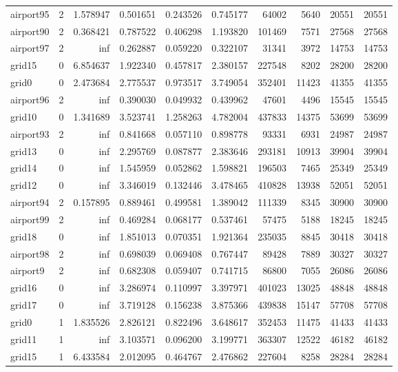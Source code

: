 \documentclass[../../../thesis.tex]{subfiles}
\begin{document}
\begin{longtable}{|l|r|r|r|r|r|r|r|r|r|}
airport95 & 2 & 1.578947 & 0.501651 & 0.243526 & 0.745177 & 64002 & 5640 & 20551 & 20551 \\
airport90 & 2 & 0.368421 & 0.787522 & 0.406298 & 1.193820 & 101469 & 7571 & 27568 & 27568 \\
airport97 & 2 & inf & 0.262887 & 0.059220 & 0.322107 & 31341 & 3972 & 14753 & 14753 \\
grid15 & 0 & 6.854637 & 1.922340 & 0.457817 & 2.380157 & 227548 & 8202 & 28200 & 28200 \\
grid0 & 0 & 2.473684 & 2.775537 & 0.973517 & 3.749054 & 352401 & 11423 & 41355 & 41355 \\
airport96 & 2 & inf & 0.390030 & 0.049932 & 0.439962 & 47601 & 4496 & 15545 & 15545 \\
grid10 & 0 & 1.341689 & 3.523741 & 1.258263 & 4.782004 & 437833 & 14375 & 53699 & 53699 \\
airport93 & 2 & inf & 0.841668 & 0.057110 & 0.898778 & 93331 & 6931 & 24987 & 24987 \\
grid13 & 0 & inf & 2.295769 & 0.087877 & 2.383646 & 293181 & 10913 & 39904 & 39904 \\
grid14 & 0 & inf & 1.545959 & 0.052862 & 1.598821 & 196503 & 7465 & 25349 & 25349 \\
grid12 & 0 & inf & 3.346019 & 0.132446 & 3.478465 & 410828 & 13938 & 52051 & 52051 \\
airport94 & 2 & 0.157895 & 0.889461 & 0.499581 & 1.389042 & 111339 & 8345 & 30900 & 30900 \\
airport99 & 2 & inf & 0.469284 & 0.068177 & 0.537461 & 57475 & 5188 & 18245 & 18245 \\
grid18 & 0 & inf & 1.851013 & 0.070351 & 1.921364 & 235035 & 8845 & 30418 & 30418 \\
airport98 & 2 & inf & 0.698039 & 0.069408 & 0.767447 & 89428 & 7889 & 30327 & 30327 \\
airport9 & 2 & inf & 0.682308 & 0.059407 & 0.741715 & 86800 & 7055 & 26086 & 26086 \\
grid16 & 0 & inf & 3.286974 & 0.110997 & 3.397971 & 401023 & 13025 & 48848 & 48848 \\
grid17 & 0 & inf & 3.719128 & 0.156238 & 3.875366 & 439838 & 15147 & 57708 & 57708 \\
grid0 & 1 & 1.835526 & 2.826121 & 0.822496 & 3.648617 & 352453 & 11475 & 41433 & 41433 \\
grid11 & 1 & inf & 3.103571 & 0.096200 & 3.199771 & 363307 & 12522 & 46182 & 46182 \\
grid15 & 1 & 6.433584 & 2.012095 & 0.464767 & 2.476862 & 227604 & 8258 & 28284 & 28284 \\

\end{longtable}
\end{document}
